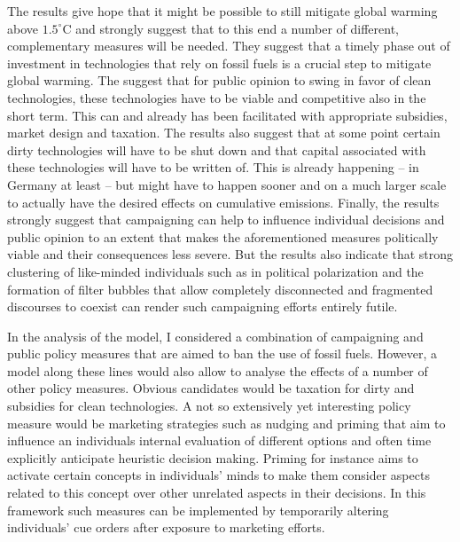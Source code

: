 The results give hope that it might be possible to still mitigate global warming above $1.5^{\circ}$C and strongly suggest that to this end a number of different, complementary measures will be needed. They suggest that a timely phase out of investment in technologies that rely on fossil fuels is a crucial step to mitigate global warming. The suggest that for public opinion to swing in favor of clean technologies, these technologies have to be viable and competitive also in the short term. This can and already has been facilitated with appropriate subsidies, market design and taxation. The results also suggest that at some point certain dirty technologies will have to be shut down and that capital associated with these technologies will have to be written of. This is already happening -- in Germany at least -- but might have to happen sooner and on a much larger scale to actually have the desired effects on cumulative emissions. Finally, the results strongly suggest that campaigning can help to influence individual decisions and public opinion to an extent that makes the aforementioned measures politically viable and their consequences less severe. But the results also indicate that strong clustering of like-minded individuals such as in political polarization and the formation of filter bubbles that allow completely disconnected and fragmented discourses to coexist can render such campaigning efforts entirely futile.

In the analysis of the model, I considered a combination of campaigning and public policy measures that are aimed to ban the use of fossil fuels. However, a model along these lines would also allow to analyse the effects of a number of other policy measures.
Obvious candidates would be taxation for dirty and subsidies for clean technologies. A not so extensively yet interesting policy measure would be marketing strategies such as nudging and priming that aim to influence an individuals internal evaluation of different options and often time explicitly anticipate heuristic decision making. Priming for instance aims to activate certain concepts in individuals' minds to make them consider aspects related to this concept over other unrelated aspects in their decisions. In this framework such measures can be implemented by temporarily altering individuals' cue orders after exposure to marketing efforts.


